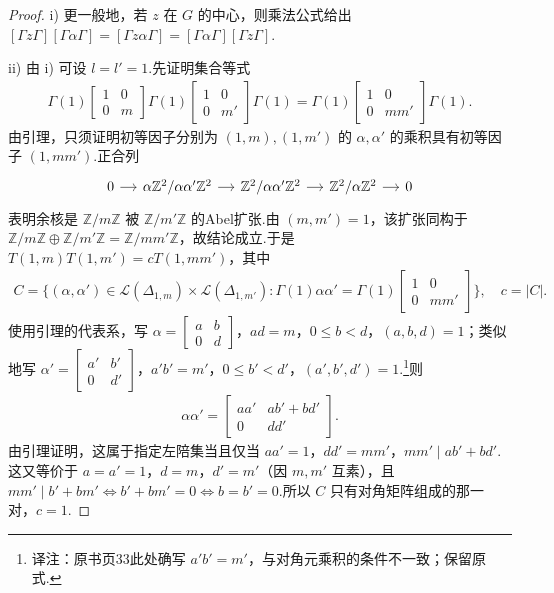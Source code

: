 \begin{proof}

i) 更一般地，若 $z$ 在 $G$ 的中心，则乘法公式给出 $[\Gamma z\Gamma][\Gamma\alpha\Gamma]=[\Gamma z\alpha\Gamma]=[\Gamma\alpha\Gamma][\Gamma z\Gamma]$.

ii) 由 i) 可设 $l=l'=1$.先证明集合等式
\begin{align*}
\Gamma(1)\begin{bmatrix}1&0\\0&m\end{bmatrix}\Gamma(1)\begin{bmatrix}1&0\\0&m'\end{bmatrix}\Gamma(1)=\Gamma(1)\begin{bmatrix}1&0\\0&mm'\end{bmatrix}\Gamma(1).
\end{align*}
由引理，只须证明初等因子分别为 $(1,m),(1,m')$ 的 $\alpha,\alpha'$ 的乘积具有初等因子 $(1,mm')$.正合列
\[
\begin{tikzcd}[column sep=small]
0 \arrow[r] & \alpha\mathbb Z^2/\alpha\alpha'\mathbb Z^2 \arrow[r] & \mathbb Z^2/\alpha\alpha'\mathbb Z^2 \arrow[r] & \mathbb Z^2/\alpha\mathbb Z^2 \arrow[r] & 0
\end{tikzcd}
\]
表明余核是 $\mathbb Z/m\mathbb Z$ 被 $\mathbb Z/m'\mathbb Z$ 的Abel扩张.由 $(m,m')=1$，该扩张同构于 $\mathbb Z/m\mathbb Z\oplus\mathbb Z/m'\mathbb Z=\mathbb Z/mm'\mathbb Z$，故结论成立.于是 $T(1,m)T(1,m')=cT(1,mm')$，其中
\begin{align*}
C=\{(\alpha,\alpha')\in\mathcal L(\Delta_{1,m})\times\mathcal L(\Delta_{1,m'}):\Gamma(1)\alpha\alpha'=\Gamma(1)\begin{bmatrix}1&0\\0&mm'\end{bmatrix}\},\quad c=|C|.
\end{align*}
使用引理的代表系，写 $\alpha=\left[\begin{smallmatrix}a&b\\0&d\end{smallmatrix}\right]$，$ad=m$，$0\le b<d$，$(a,b,d)=1$；类似地写 $\alpha'=\left[\begin{smallmatrix}a'&b'\\0&d'\end{smallmatrix}\right]$，$a'b'=m'$，$0\le b'<d'$，$(a',b',d')=1$.\footnote{译注：原书页33此处确写 $a'b'=m'$，与对角元乘积的条件不一致；保留原式.}则
\begin{align*}
\alpha\alpha'=\begin{bmatrix}aa'&ab'+bd'\\0&dd'\end{bmatrix}.
\end{align*}
由引理证明，这属于指定左陪集当且仅当 $aa'=1$，$dd'=mm'$，$mm'\mid ab'+bd'$.这又等价于 $a=a'=1$，$d=m$，$d'=m'$（因 $m,m'$ 互素），且 $mm'\mid b'+bm'\Longleftrightarrow b'+bm'=0\Longleftrightarrow b=b'=0$.所以 $C$ 只有对角矩阵组成的那一对，$c=1$.


\end{proof}
